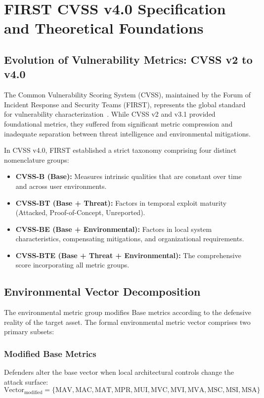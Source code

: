\chapter{FIRST CVSS v4.0 Specification and Theoretical Foundations}
\label{chap:cvss_foundations}

\section{Evolution of Vulnerability Metrics: CVSS v2 to v4.0}
The Common Vulnerability Scoring System (CVSS), maintained by the Forum of Incident Response and Security Teams (FIRST), represents the global standard for vulnerability characterization~\cite{first_cvss_v4}. While CVSS v2 and v3.1 provided foundational metrics, they suffered from significant metric compression and inadequate separation between threat intelligence and environmental mitigations.

In CVSS v4.0, FIRST established a strict taxonomy comprising four distinct nomenclature groups:
\begin{itemize}
    \item \textbf{CVSS-B (Base):} Measures intrinsic qualities that are constant over time and across user environments.
    \item \textbf{CVSS-BT (Base + Threat):} Factors in temporal exploit maturity (Attacked, Proof-of-Concept, Unreported).
    \item \textbf{CVSS-BE (Base + Environmental):} Factors in local system characteristics, compensating mitigations, and organizational requirements.
    \item \textbf{CVSS-BTE (Base + Threat + Environmental):} The comprehensive score incorporating all metric groups.
\end{itemize}

\section{Environmental Vector Decomposition}
The environmental metric group modifies Base metrics according to the defensive reality of the target asset. The formal environmental metric vector comprises two primary subsets:

\subsection{Modified Base Metrics}
Defenders alter the base vector when local architectural controls change the attack surface:
\begin{equation}
    \text{Vector}_{\text{modified}} = \{\text{MAV}, \text{MAC}, \text{MAT}, \text{MPR}, \text{MUI}, \text{MVC}, \text{MVI}, \text{MVA}, \text{MSC}, \text{MSI}, \text{MSA}\}
\end{equation}

